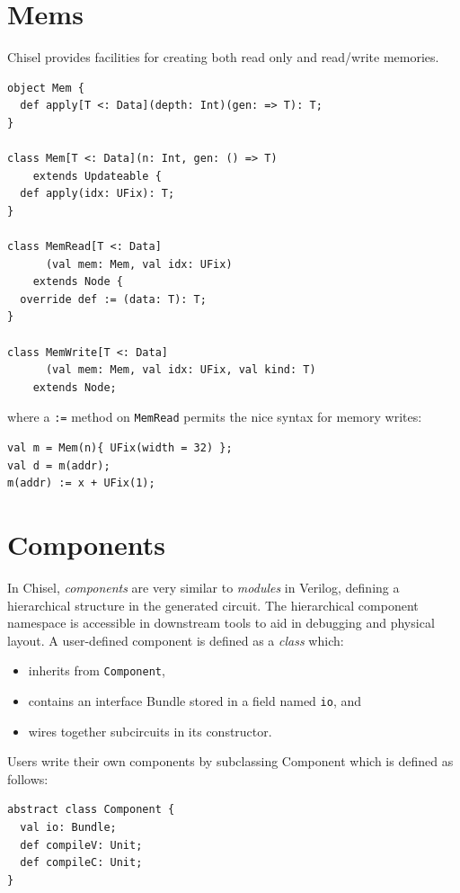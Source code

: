 \documentclass[10pt,twocolumn]{article}
\def\code#1{{\small\tt #1}}
\begin{document}
\section{Mems}

Chisel provides facilities for creating both read only and
read/write memories.  

\begin{lstlisting}
object Mem {
  def apply[T <: Data](depth: Int)(gen: => T): T;
}

class Mem[T <: Data](n: Int, gen: () => T) 
    extends Updateable {
  def apply(idx: UFix): T;
}

class MemRead[T <: Data]
      (val mem: Mem, val idx: UFix) 
    extends Node {
  override def := (data: T): T;
}

class MemWrite[T <: Data]
      (val mem: Mem, val idx: UFix, val kind: T) 
    extends Node;
\end{lstlisting}

\noindent
where a \code{:=} method on \code{MemRead} permits the nice syntax for
memory writes:

\begin{lstlisting}
val m = Mem(n){ UFix(width = 32) };
val d = m(addr);
m(addr) := x + UFix(1);
\end{lstlisting}

\section{Components}

In Chisel, {\em components} are very similar to {\em modules} in
Verilog, defining a hierarchical structure in the generated circuit.
The hierarchical component namespace is accessible in downstream tools
to aid in debugging and physical layout.  A user-defined component is
defined as a {\em class} which:
\begin{itemize}
\item inherits from \code{Component},
\item contains an interface Bundle stored in a field named \code{io}, and
\item wires together subcircuits in its constructor.
\end{itemize}

Users write their own components by subclassing Component which is
defined as follows:

\begin{lstlisting}
abstract class Component {
  val io: Bundle;
  def compileV: Unit;
  def compileC: Unit;
}
\end{lstlisting}
\end{document}
